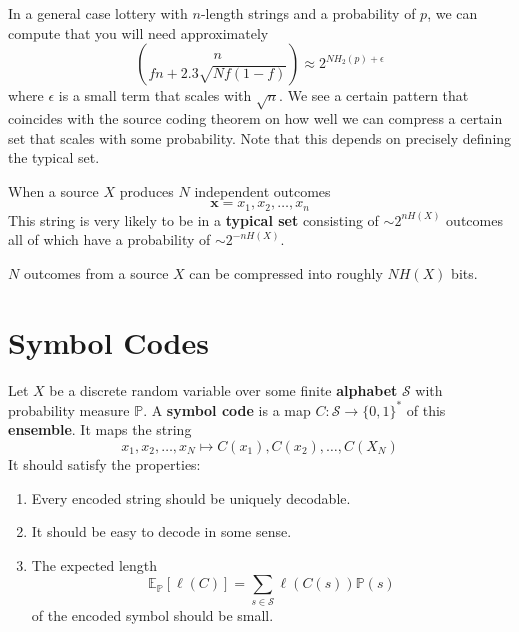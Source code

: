 \documentclass{article}
\begin{document}
    In a general case lottery with $n$-length strings and a probability of $p$, we can compute that you will need approximately 
    \begin{equation}
      \binom{n}{f n + 2.3 \sqrt{N f (1 - f)}} \approx 2^{N H_2 (p) + \epsilon} 
    \end{equation}
    where $\epsilon$ is a small term that scales with $\sqrt{n}$. We see a certain pattern that coincides with the source coding theorem on how well we can compress a certain set that scales with some probability. Note that this depends on precisely defining the typical set. 

    \begin{definition}
      When a source $X$ produces $N$ independent outcomes 
      \begin{equation}
        \mathbf{x} = x_1, x_2, \ldots, x_n
      \end{equation}
      This string is very likely to be in a \textbf{typical set} consisting of $\sim 2^{n H(X)}$ outcomes all of which have a probability of $\sim 2^{-n H(X)}$. 
    \end{definition}

    \begin{theorem}
      $N$ outcomes from a source $X$ can be compressed into roughly $N H(X)$ bits. 
    \end{theorem}

\section{Symbol Codes}

    \begin{definition}
      Let $X$ be a discrete random variable over some finite \textbf{alphabet} $\mathcal{S}$ with probability measure $\mathbb{P}$. A \textbf{symbol code} is a map $C: \mathcal{S} \rightarrow \{0, 1\}^\ast$ of this \textbf{ensemble}. It maps the string 
      \begin{equation}
        x_1, x_2, \ldots, x_N \mapsto C(x_1), C(x_2), \ldots, C(X_N)
      \end{equation}
      It should satisfy the properties: 
      \begin{enumerate}
        \item Every encoded string should be uniquely decodable. 
        \item It should be easy to decode in some sense. 
        \item The expected length 
          \begin{equation}
            \mathbb{E}_{\mathbb{P}} [\ell(C)] = \sum_{s \in \mathcal{S}} \ell(C(s)) \mathbb{P}(s)
          \end{equation}
          of the encoded symbol should be small. 
      \end{enumerate}
    \end{definition}
\end{document}
